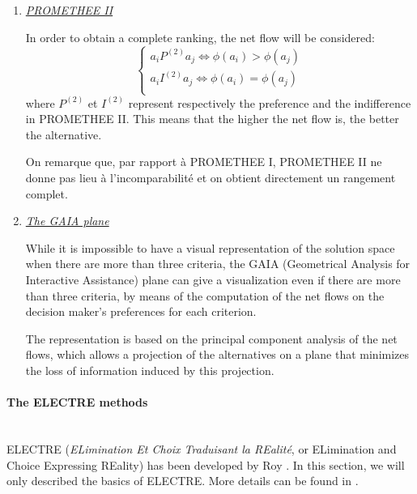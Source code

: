 \begin{enumerate}
\item \textit{\underline{PROMETHEE II}}

In order to obtain a complete ranking, the net flow will be considered:
\begin{equation}
\begin{cases}
a_iP^{(2)}a_j \Leftrightarrow \phi(a_i) > \phi(a_j)\\
a_iI^{(2)}a_j \Leftrightarrow \phi(a_i) = \phi(a_j)\\
\end{cases}
\end{equation}
where $P^{(2)}$ et $I^{(2)}$ represent respectively the preference and the indifference in PROMETHEE II. This means that the higher the net flow is, the better the alternative.

On remarque que, par rapport à PROMETHEE I, PROMETHEE II ne donne pas lieu à l'incomparabilité et on obtient directement un rangement complet.

\item \textit{\underline{The GAIA plane}}

While it is impossible to have a visual representation of the solution space when there are more than three criteria, the GAIA (Geometrical Analysis for Interactive Assistance) plane can give a visualization even if there are more than three criteria, by means of the computation of the net flows on the decision maker's preferences for each criterion.

The representation is based on the principal component analysis of the net flows, which allows a projection of the alternatives on a plane that minimizes the loss of information induced by this projection.
\end{enumerate}

\paragraph{The ELECTRE methods}~\\
ELECTRE (\textit{ELimination Et Choix Traduisant la REalité}, or ELimination and Choice Expressing REality) has been developed by Roy \cite{Roy66}. In this section, we will only described the basics of ELECTRE. More details can be found in \cite{electre}.

